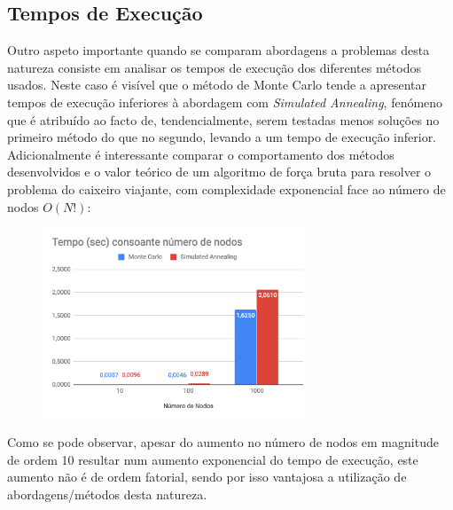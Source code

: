 \documentclass{article}
\begin{document}
\subsection{Tempos de Execução}
Outro aspeto importante quando se comparam abordagens a problemas desta natureza consiste em analisar os tempos de execução dos diferentes métodos usados.
Neste caso é visível que o método de Monte Carlo tende a apresentar tempos de execução inferiores à abordagem com \textit{Simulated Annealing}, fenómeno
que é atribuído ao facto de, tendencialmente, serem testadas menos soluções no primeiro método do que no segundo, levando a um tempo de execução inferior.
Adicionalmente é interessante comparar o comportamento dos métodos desenvolvidos e o valor teórico de um algoritmo de força bruta para resolver o problema
do caixeiro viajante, com complexidade exponencial face ao número de nodos $O(N!)$:

\begin{figure}[H]
    \centering
    \includegraphics[width=8cm]{Pictures/ExecTimes.png}
\end{figure}

Como se pode observar, apesar do aumento no número de nodos em magnitude de ordem 10 resultar num aumento exponencial do tempo de execução, este aumento
não é de ordem fatorial, sendo por isso vantajosa a utilização de abordagens/métodos desta natureza.
\end{document}
